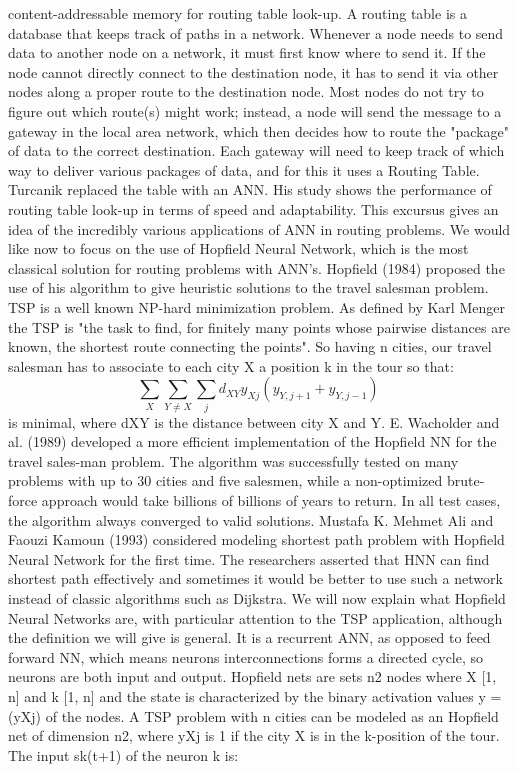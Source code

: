 content-addressable memory for routing table look-up.
A routing table is a database that keeps track of paths in a network. Whenever a node needs to send 
data to another node on a network, it must first know where to send it. If the node cannot directly 
connect to the destination node, it has to send it via other nodes along a proper route to the 
destination node. Most nodes do not try to figure out which route(s) might work; instead, a node will 
send the message to a gateway in the local area network, which then decides how to route the "package"
 of data to the correct destination. Each gateway will need to keep track of which way to deliver 
 various packages of data, and for this it uses a Routing Table. 
Turcanik replaced the table with an ANN. His study shows the performance of routing table look-up in 
terms of speed and adaptability.
\bigbreak
This excursus gives an idea of the incredibly various applications of ANN in routing problems.
We would like now to focus on the use of Hopfield Neural Network, which is the most classical solution 
for routing problems with ANN's.
\bigbreak
Hopfield (1984) proposed the use of his algorithm to give heuristic solutions to the travel salesman 
problem.
TSP is a well known NP-hard minimization problem. As defined by Karl Menger the TSP is "the task to 
find, for finitely many points whose pairwise distances are known, the shortest route connecting the 
points". So having n cities, our travel salesman has to associate to each city X a position k in the 
tour so that: 
\begin{equation*}
\sum_{X}\sum_{Y\neq X}\sum_{j}{d_{XY}y_{Xj}(y_{Y,j+1}+y_{Y,j-1})\ }
\end{equation*}
is minimal, where dXY is the distance between city X and Y.
\bigbreak
E. Wacholder and al. (1989) developed a more efficient implementation of the Hopfield NN for the travel
sales-man problem. The algorithm was successfully tested on many problems with up to 30 cities and five
salesmen, while a non-optimized brute-force approach would take billions of billions of years to 
return. In all test cases, the algorithm always converged to valid solutions.
\bigbreak
Mustafa K. Mehmet Ali and Faouzi Kamoun (1993) considered modeling shortest path problem with Hopfield 
Neural Network for the first time. The researchers asserted that HNN can find shortest path effectively
 and sometimes it would be better to use such a network instead of classic algorithms such as Dijkstra.
\bigbreak
We will now explain what Hopfield Neural Networks are, with particular attention to the TSP application,
 although the definition we will give is general.
It is a recurrent ANN, as opposed to feed forward NN, which means neurons interconnections forms a 
directed cycle, so neurons are both input and output. 
Hopfield nets are sets n2 nodes where X [1, n] and k  [1, n] and the state is characterized by the 
binary activation values y = (yXj) of the nodes.
A TSP problem with n cities can be modeled as an Hopfield net of dimension n2, where yXj is 1 if the 
city X is in the k-position of the tour.
\bigbreak
The input sk(t+1) of the neuron k is:


